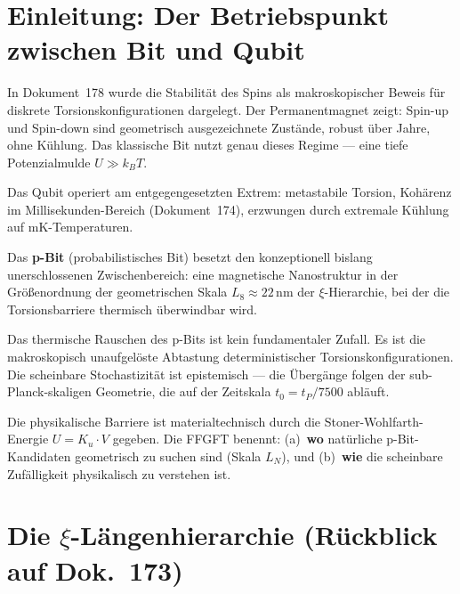 	\maketitle
	\tableofcontents
	\newpage
	
	\section{Einleitung: Der Betriebspunkt zwischen Bit und Qubit}
	\label{sec:einleitung}
	
	In Dokument~178 wurde die Stabilität des Spins als makroskopischer Beweis
	für diskrete Torsionskonfigurationen dargelegt. Der Permanentmagnet zeigt:
	Spin-up und Spin-down sind geometrisch ausgezeichnete Zustände, robust über
	Jahre, ohne Kühlung. Das klassische Bit nutzt genau dieses Regime ---
	eine tiefe Potenzialmulde $U \gg k_B T$.
	
	Das Qubit operiert am entgegengesetzten Extrem: metastabile Torsion,
	Kohärenz im Millisekunden-Bereich (Dokument~174), erzwungen durch
	extremale Kühlung auf mK-Temperaturen.
	
	Das \textbf{p-Bit} (probabilistisches Bit) besetzt den konzeptionell
	bislang unerschlossenen Zwischenbereich: eine magnetische Nanostruktur
	in der Größenordnung der geometrischen Skala $L_8 \approx 22\,\text{nm}$ der
	$\xi$-Hierarchie, bei der die Torsionsbarriere thermisch überwindbar wird.
	
	\begin{significance}
		Das thermische Rauschen des p-Bits ist kein fundamentaler Zufall.
		Es ist die makroskopisch unaufgelöste Abtastung deterministischer
		Torsionskonfigurationen. Die scheinbare Stochastizität ist epistemisch
		--- die Übergänge folgen der sub-Planck-skaligen Geometrie,
		die auf der Zeitskala $t_0 = t_P/7500$ abläuft.
		
		Die physikalische Barriere ist materialtechnisch durch die
		Stoner-Wohlfarth-Energie $U = K_u \cdot V$ gegeben.
		Die FFGFT benennt: (a)~\textbf{wo} natürliche p-Bit-Kandidaten
		geometrisch zu suchen sind (Skala $L_N$), und (b)~\textbf{wie} die
		scheinbare Zufälligkeit physikalisch zu verstehen ist.
	\end{significance}
	
	\section{Die \texorpdfstring{$\xi$}{xi}-Längenhierarchie
		(Rückblick auf Dok.~173)}
	\label{sec:laengenhierarchie}
	
